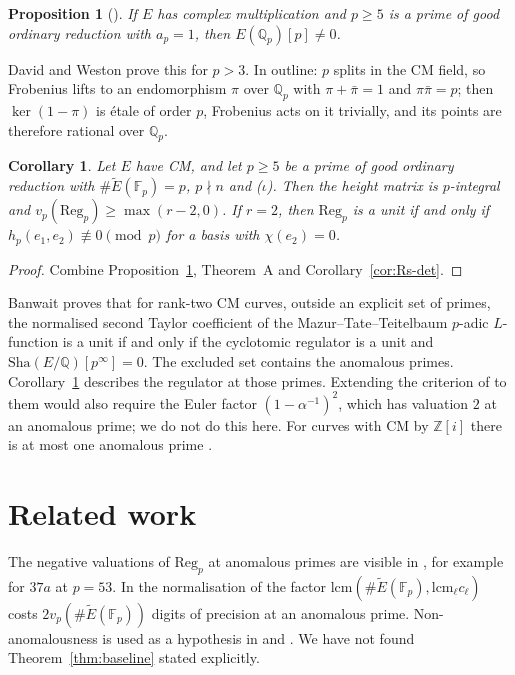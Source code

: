 \documentclass[11pt,a4paper]{amsart}
\newcommand{\Q}{\mathbb{Q}}
\newcommand{\Z}{\mathbb{Z}}
\newcommand{\Qp}{\mathbb{Q}_p}
\newcommand{\Fp}{\mathbb{F}_p}
\newcommand{\Reg}{\mathrm{Reg}}
\newcommand{\Et}{\widetilde{E}}
\theoremstyle{plain}
\newtheorem{proposition}[theorem]{Proposition}
\newtheorem{corollary}[theorem]{Corollary}
\theoremstyle{definition}
\theoremstyle{remark}
\begin{document}
\begin{proposition}[{\cite[Prop.~2.1(3)]{DW}}]\label{prop:CM}
If $E$ has complex multiplication and $p\ge5$ is a prime of good ordinary reduction with $a_p=1$, then $E(\Qp)[p]\ne0$.
\end{proposition}

David and Weston prove this for $p>3$. In outline: $p$ splits in the CM field, so Frobenius lifts to an endomorphism $\pi$ over $\Qp$ with $\pi+\bar\pi=1$ and $\pi\bar\pi=p$; then $\ker(1-\pi)$ is étale of order $p$, Frobenius acts on it trivially, and its points are therefore rational over $\Qp$.

\begin{corollary}\label{cor:CM-rank2}
Let $E$ have CM, and let $p\ge5$ be a prime of good ordinary reduction with $\#\Et(\Fp)=p$, $p\nmid n$ and \textup{($\iota$)}. Then the height matrix is $p$-integral and $v_p(\Reg_p)\ge\max(r-2,0)$. If $r=2$, then $\Reg_p$ is a unit if and only if $h_p(e_1,e_2)\not\equiv0\pmod p$ for a basis with $\chi(e_2)=0$.
\end{corollary}

\begin{proof}
Combine Proposition~\ref{prop:CM}, Theorem~A and Corollary~\ref{cor:Rs-det}.
\end{proof}

Banwait \cite{Ban} proves that for rank-two CM curves, outside an explicit set of primes, the normalised second Taylor coefficient of the Mazur--Tate--Teitelbaum $p$-adic $L$-function is a unit if and only if the cyclotomic regulator is a unit and $\mathrm{Sha}(E/\Q)[p^\infty]=0$. The excluded set contains the anomalous primes. Corollary~\ref{cor:CM-rank2} describes the regulator at those primes. Extending the criterion of \cite{Ban} to them would also require the Euler factor $(1-\alpha^{-1})^2$, which has valuation $2$ at an anomalous prime; we do not do this here. For curves with CM by $\Z[i]$ there is at most one anomalous prime \cite[Lemma~2.2]{Ban}.

\section{Related work}\label{sec:related}

The negative valuations of $\Reg_p$ at anomalous primes are visible in \cite[\S4]{MST}, for example for $37a$ at $p=53$. In the normalisation of \cite{Har} the factor $\mathrm{lcm}(\#\Et(\Fp),\mathrm{lcm}_\ell c_\ell)$ costs $2v_p(\#\Et(\Fp))$ digits of precision at an anomalous prime. Non-anomalousness is used as a hypothesis in \cite{BCS} and \cite[\S2.2]{Ban}. We have not found Theorem~\ref{thm:baseline} stated explicitly.
\end{document}
